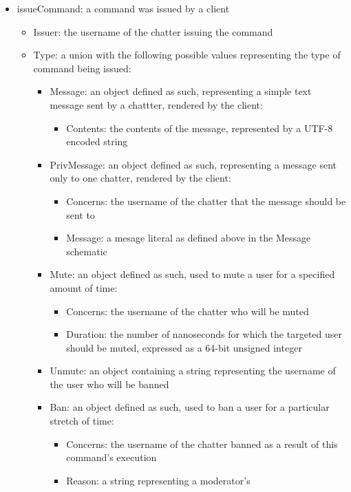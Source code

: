 \documentclass{article}
\begin{document}
\begin{itemize}
	\item issueCommand: a command was issued by a client
		\begin{itemize}
			\item Issuer: the username of the chatter issuing the command
			\item Type: a union with the following possible values representing
				the type of command being issued:
				\begin{itemize}
					\item Message: an object defined as such, representing a
						simple text message sent by a chattter, rendered by the
						client:
						\begin{itemize}
							\item Contents: the contents of the message,
								represented by a UTF-8 encoded string
						\end{itemize}
					\item PrivMessage: an object defined as such, representing
						a message sent only to one chatter, rendered by the client:
						\begin{itemize}
							\item Concerns: the username of the chatter that the
								message should be sent to
							\item Message: a mesage literal as defined above in
								the Message schematic
						\end{itemize}
					\item Mute: an object defined as such, used to mute a user for
						a specified amount of time:
						\begin{itemize}
							\item Concerns: the username of the chatter who will
								be muted
							\item Duration: the number of nanoseconds for which
								the targeted user should be muted, expressed as
								a 64-bit unsigned integer
						\end{itemize}
					\item Unmute: an object containing a string representing
						the username of the user who will be banned
					\item Ban: an object defined as such, used to ban a user
						for a particular stretch of time:
						\begin{itemize}
							\item Concerns: the username of the chatter banned
								as a result of this command's execution
							\item Reason: a string representing a moderator's

\end{itemize}
\end{itemize}
\end{itemize}
\end{itemize}
\end{document}
